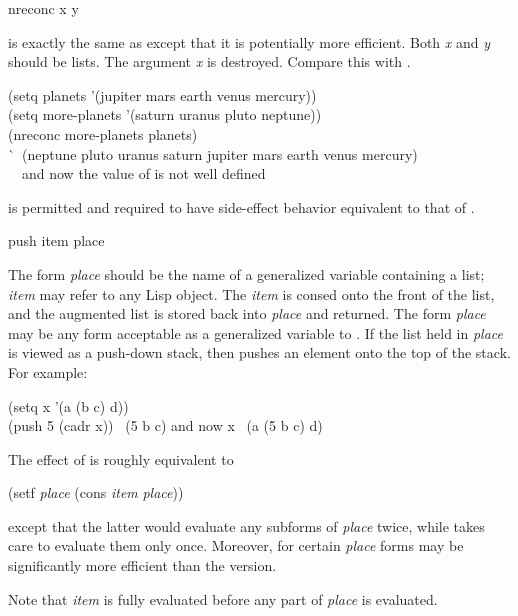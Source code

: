 
\begin{defun}[Function]
nreconc x y

 is exactly the same as 
 except that it is potentially more
efficient.  Both \emph{x} and \emph{y} should be lists.
The argument \emph{x} is destroyed.
Compare this with .

\begin{lisp}
(setq planets '(jupiter mars earth venus mercury)) \\
(setq more-planets '(saturn uranus pluto neptune)) \\
(nreconc more-planets planets) \\
\`\EV\ (neptune pluto uranus saturn jupiter mars earth venus mercury) \\
~~\textrm{and now the value of  is not well defined}
\end{lisp}

 is permitted and
required to have side-effect behavior
equivalent to that of .
\end{defun}

\begin{defmac}
push item place

The form \emph{place} should be the name of a generalized variable
containing a list; \emph{item} may refer to any Lisp object.  The \emph{item}
is consed onto the front of the list, and the augmented list is stored
back into \emph{place} and returned.
The form \emph{place} may be any form acceptable as a
generalized variable to .  If the list held in \emph{place} is
viewed as a push-down stack, then  pushes an element onto the top
of the stack.
For example:
\begin{lisp}
(setq x '(a (b c) d)) \\
(push 5 (cadr x)) \EV\ (5 b c)  \textrm{and now} x \EV\ (a (5 b c) d)
\end{lisp}
The effect of 
is roughly equivalent to
\begin{lisp}
(setf \emph{place} (cons \emph{item} \emph{place}))
\end{lisp}
except that the latter would evaluate any subforms of \emph{place}
twice, while  takes care to evaluate them only once.
Moreover, for certain \emph{place} forms  may be
significantly more efficient than the  version.

Note that \emph{item} is fully evaluated before any part of \emph{place}
is evaluated.
\end{defmac}

